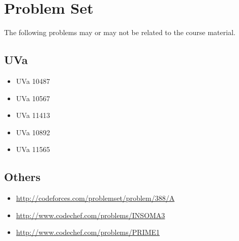 \section{Problem Set}

The following problems may or may not be related
to the course material.

%
%
%

\subsection{UVa}
\begin{itemize}
    \item UVa 10487
    \item UVa 10567
    \item UVa 11413
    \item UVa 10892
    \item UVa 11565
\end{itemize}

\subsection{Others}
\begin{itemize}
    \item \url{http://codeforces.com/problemset/problem/388/A}
    \item \url{http://www.codechef.com/problems/INSOMA3}
    \item \url{http://www.codechef.com/problems/PRIME1}
\end{itemize}
